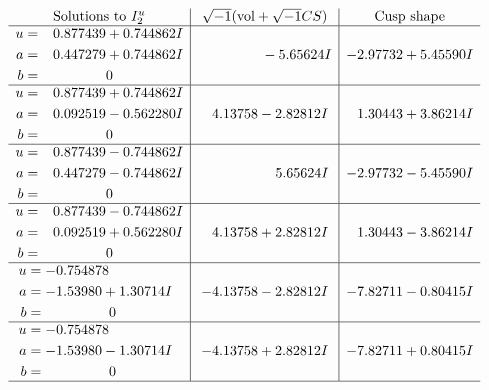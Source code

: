 \documentclass[1p]{elsarticle_modified}
\theoremstyle{definition}
\newcommand{\I}{\sqrt{-1}}
\begin{document}
$$\begin{array}{c|c|c}  
\text{Solutions to }I^u_{2}& \I (\text{vol} + \sqrt{-1}CS) & \text{Cusp shape}\\
 \hline 
\begin{aligned}
u &= \phantom{-}0.877439 + 0.744862 I \\
a &= \phantom{-}0.447279 + 0.744862 I \\
b &= \phantom{-0.000000 } 0\end{aligned}
 & \phantom{-0.000000 } -5.65624 I & -2.97732 + 5.45590 I \\ \hline\begin{aligned}
u &= \phantom{-}0.877439 + 0.744862 I \\
a &= \phantom{-}0.092519 - 0.562280 I \\
b &= \phantom{-0.000000 } 0\end{aligned}
 & \phantom{-}4.13758 - 2.82812 I & \phantom{-}1.30443 + 3.86214 I \\ \hline\begin{aligned}
u &= \phantom{-}0.877439 - 0.744862 I \\
a &= \phantom{-}0.447279 - 0.744862 I \\
b &= \phantom{-0.000000 } 0\end{aligned}
 & \phantom{-0.000000 -}5.65624 I & -2.97732 - 5.45590 I \\ \hline\begin{aligned}
u &= \phantom{-}0.877439 - 0.744862 I \\
a &= \phantom{-}0.092519 + 0.562280 I \\
b &= \phantom{-0.000000 } 0\end{aligned}
 & \phantom{-}4.13758 + 2.82812 I & \phantom{-}1.30443 - 3.86214 I \\ \hline\begin{aligned}
u &= -0.754878\phantom{ +0.000000I} \\
a &= -1.53980 + 1.30714 I \\
b &= \phantom{-0.000000 } 0\end{aligned}
 & -4.13758 - 2.82812 I & -7.82711 - 0.80415 I \\ \hline\begin{aligned}
u &= -0.754878\phantom{ +0.000000I} \\
a &= -1.53980 - 1.30714 I \\
b &= \phantom{-0.000000 } 0\end{aligned}
 & -4.13758 + 2.82812 I & -7.82711 + 0.80415 I\\
 \hline 
 \end{array}$$\newpage\newpage\renewcommand{\arraystretch}{1}
\end{document}
